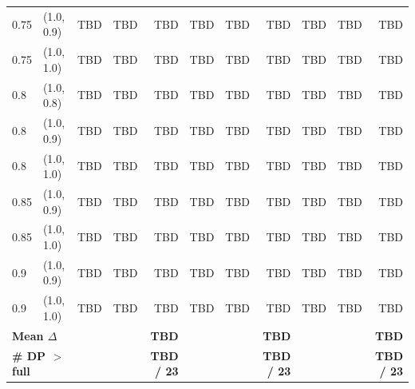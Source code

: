 \begin{table}[t]
\begin{tabular}{l l rrr rrr rrr}
0.75  & (1.0, 0.9)   & TBD & TBD & TBD & TBD & TBD & TBD & TBD & TBD & TBD \\
0.75  & (1.0, 1.0)   & TBD & TBD & TBD & TBD & TBD & TBD & TBD & TBD & TBD \\
0.8   & (1.0, 0.8)   & TBD & TBD & TBD & TBD & TBD & TBD & TBD & TBD & TBD \\
0.8   & (1.0, 0.9)   & TBD & TBD & TBD & TBD & TBD & TBD & TBD & TBD & TBD \\
0.8   & (1.0, 1.0)   & TBD & TBD & TBD & TBD & TBD & TBD & TBD & TBD & TBD \\
0.85  & (1.0, 0.9)   & TBD & TBD & TBD & TBD & TBD & TBD & TBD & TBD & TBD \\
0.85  & (1.0, 1.0)   & TBD & TBD & TBD & TBD & TBD & TBD & TBD & TBD & TBD \\
0.9   & (1.0, 0.9)   & TBD & TBD & TBD & TBD & TBD & TBD & TBD & TBD & TBD \\
0.9   & (1.0, 1.0)   & TBD & TBD & TBD & TBD & TBD & TBD & TBD & TBD & TBD \\
\midrule
\multicolumn{2}{l}{\textbf{Mean $\Delta$}}
                    &     &      & \textbf{TBD} &     &      & \textbf{TBD} &     &      & \textbf{TBD} \\
\multicolumn{2}{l}{\textbf{\# DP $>$ full}}
                    &     &      & \textbf{TBD / 23} &     &      & \textbf{TBD / 23} &     &      & \textbf{TBD / 23} \\
\bottomrule
\end{tabular}
\end{table}
